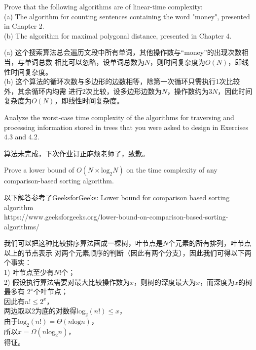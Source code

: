 \documentclass[11pt, a4paper, UTF8]{ctexart}
\begin{document}
\begin{problem}[DH: 6.8]
  Prove that the following algorithms are of linear-time complexity:\\
  (a) The algorithm for counting sentences containing the word "money", presented in 
  Chapter 2.\\
  (b) The algorithm for maximal polygonal distance, presented in Chapter 4.
\end{problem}

\begin{solution}
  (a) 这个搜索算法总会遍历文段中所有单词，其他操作数与“money”的出现次数相当，与单词总数
  相比可以忽略，设单词总数为$N$，则时间复杂度为$O(N)$，即线性时间复杂度。\\
  (b) 这个算法的循环次数与多边形的边数相等，除第一次循环只需执行1次比较外，其余循环内均需
  进行2次比较，设多边形边数为$N$，操作数约为$3N$，因此时间复杂度为$O(N)$，即线性时间复杂度。
\end{solution}
\begin{problem}[UD: 6.10]
  Analyze the worst-case time complexity of the algorithms for traversing and processing 
  information stored in trees that you were asked to design in Exercises 4.3 and 4.2.
\end{problem}


\begin{solution}
  算法未完成，下次作业订正麻烦老师了，致歉。
\end{solution}

\begin{problem}[DH: 6.13]
  Prove a lower bound of $O(N \times \text{log}_{2}N)$ on the time complexity of any 
  comparison-based sorting algorithm.
\end{problem}

\begin{remark}
  以下解答参考了GeeksforGeeks: Lower bound for comparison based sorting algorithm\\
  https://www.geeksforgeeks.org/lower-bound-on-comparison-based-sorting-algorithms/
\end{remark}

\begin{solution}
  我们可以把这种比较排序算法画成一棵树，叶节点是$N$个元素的所有排列，叶节点以上的节点表示
  对两个元素顺序的判断（因此有两个分支），因此我们可得以下两个事实：\\
  1) 叶节点至少有$N!$个；\\
  2) 假设执行算法需要对最大比较操作数为$x$，则树的深度最大为$x$，而深度为$x$的树最多有
  $2^{x}$个叶节点；\\
  因此有$n! \leq 2^{x}$，\\
  两边取以2为底的对数得$\text{log}_{2}(n!) \leq x$，\\
  由于$\text{log}_{2}(n!) = \Theta(n\text{log}n)$，\\
  所以$x = \Omega(n\text{log}_{2}n)$，\\
  得证。
\end{solution}
\end{document}
